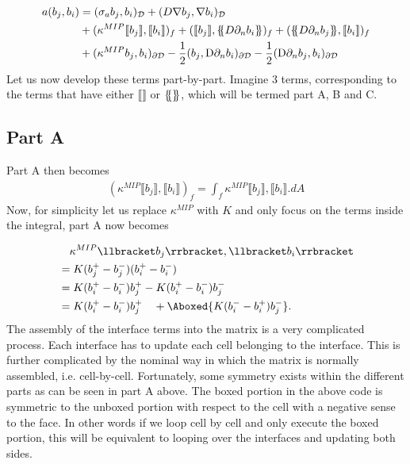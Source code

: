 \documentclass[11pt,letterpaper,titlepage]{article}
\newcommand*{\ldblbrace}{\{\mskip-5mu\{}
\newcommand*{\rdblbrace}{\}\mskip-5mu\}}
\numberwithin{equation}{section}
\begin{document}
\begin{equation*}
\begin{aligned}
a(b_j,b_i) &= 
(\sigma_a b_j, b_i)_{\mathcal{D}} + 
(D\nabla b_j,\nabla b_i)_{\mathcal{D}} \\
&+ 
(\kappa^{MIP} \llbracket b_j \rrbracket,\llbracket b_i \rrbracket)_f +
(\llbracket b_j \rrbracket,\ldblbrace D \partial_n b_i \rdblbrace)_f +
(\ldblbrace D \partial_n b_j \rdblbrace,\llbracket b_i \rrbracket)_f \\
&+
(\kappa^{M I P} b_j, b_{i})_{\partial \mathcal{D}} -
\frac{1}{2}(b_j, \mathrm{D} \partial_{n} b_{i})_{\partial \mathcal{D}}-
\frac{1}{2}(\mathrm{D} \partial_{n} b_j, b_{i})_{\partial \mathcal{D}}
\end{aligned}
\end{equation*}
\newline 
Let us now develop these terms part-by-part. Imagine 3 terms, corresponding to the terms that have
either $\llbracket \rrbracket$ or $\ldblbrace \rdblbrace$, which will be termed part A, B and C.

\newpage
\subsection{Part A}
Part A then becomes
\begin{equation*}
\begin{aligned}
(\kappa^{MIP} \llbracket b_j \rrbracket,\llbracket b_i \rrbracket)_f = 
\int_f \kappa^{MIP} \llbracket b_j \rrbracket,\llbracket b_i \rrbracket .dA
\end{aligned}
\end{equation*}
Now, for simplicity let us replace $\kappa^{MIP}$ with $K$ and only focus on the terms inside
the integral, part A now becomes

\begin{equation}
\begin{aligned}
&\quad \kappa^{MIP} \llbracket b_j \rrbracket,\llbracket b_i \rrbracket \\ 
&= K (b_j^+ - b_j^-)(b_i^+ - b_i^-) \\
&= K (b_i^+ - b_i^-) b_j^+ - K (b_i^+ - b_i^-) b_j^-  \\
&= K (b_i^+ - b_i^-) b_j^+ \quad + \Aboxed{K (b_i^- - b_i^+) b_j^-} .
\end{aligned}
\end{equation}
\newline 
The assembly of the interface terms into the matrix is a very complicated
 process. Each interface has to update each cell belonging to the 
 interface. This is further complicated by the nominal way in which the
 matrix is normally assembled, i.e. cell-by-cell. Fortunately, some 
 symmetry exists within the different parts as can be seen in part A above.
 The boxed portion in the above code is symmetric to the unboxed portion
 with respect to the cell with a negative sense to the face. In other words
 if we loop cell by cell and only execute the boxed portion, this will be
 equivalent to looping over the interfaces and updating both sides.
\end{document}
